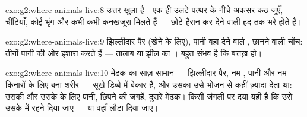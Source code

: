\begin{solution}{exo:g2:where-animals-live:8}
उत्तर खुला है। एक ही उलटे पत्थर के नीचे अकसर कठ-जूएँ, चींटियाँ, कोई
भृंग और कभी-कभी कनखजूरा मिलते हैं --- छोटे  हैरान कर देने वाली
हद तक भरे होते हैं।
\end{solution}

\begin{solution}{exo:g2:where-animals-live:9}
झिल्लीदार पैर (खेने के लिए), पानी बहा देने वाले , छानने वाली चोंच:
तीनों पानी की ओर इशारा करते हैं --- तालाब या झील का ।  बहुत
संभव है कि बत्तख़ हो।
\end{solution}

\begin{solution}{exo:g2:where-animals-live:10}
मेंढक का साज़-सामान --- झिल्लीदार पैर, नम , पानी और नम किनारों
के लिए बना शरीर --- सूखे डिब्बे में बेकार है, और उसका  उसे भोजन
से कहीं ज़्यादा देता था: उसकी  और उसके  के लिए पानी, छिपने
की जगहें, दूसरे मेंढक। किसी जंगली  पर दया यही है कि उसे उसके 
में रहने दिया जाए --- या वहाँ लौटा दिया जाए।
\end{solution}
